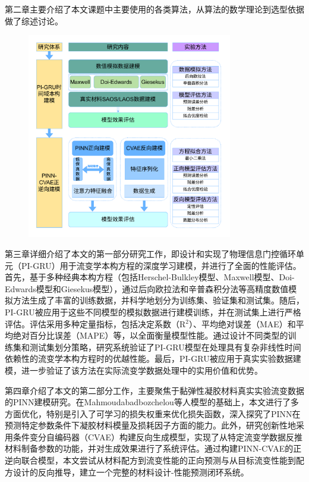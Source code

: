 第二章主要介绍了本文课题中主要使用的各类算法，从算法的数学理论到选型依据做了综述讨论。
\begin{figure}[htbp]
  \centering
  \includegraphics[width=0.8\textwidth]{Fig/HolisticResearchFramework.pdf}
\end{figure}


第三章详细介绍了本文的第一部分研究工作，即设计和实现了物理信息门控循环单元（PI-GRU）用于流变学本构方程的深度学习建模，并进行了全面的性能评估。首先，基于多种经典本构方程（包括Herschel-Bulkley模型、Maxwell模型、Doi-Edwards模型和Giesekus模型），通过后向欧拉法和辛普森积分法等高精度数值模拟方法生成了丰富的训练数据，并科学地划分为训练集、验证集和测试集。随后，PI-GRU被应用于这些不同模型的模拟数据进行建模训练，并在测试集上进行严格评估。评估采用多种定量指标，包括决定系数（R$^2$）、平均绝对误差（MAE）和平均绝对百分比误差（MAPE）等，以全面衡量模型性能。通过设计不同类型的训练集和测试集划分策略，研究系统验证了PI-GRU模型在处理具有复杂非线性时间依赖性的流变学本构方程时的优越性能。最后，PI-GRU被应用于真实实验数据建模，进一步验证了该方法在实际流变学数据处理中的实用价值和优势。

第四章介绍了本文的第二部分工作，主要聚焦于黏弹性凝胶材料真实实验流变数据的PINN建模研究。在Mahmoudabadbozchelou等人模型的基础上\cite{mahmoudabadbozchelouDatadrivenPhysicsinformedConstitutive2021}，本文进行了多方面优化，特别是引入了可学习的损失权重来优化损失函数，深入探究了PINN在预测特定参数条件下凝胶材料模量及损耗因子方面的能力。此外，研究创新性地采用条件变分自编码器（CVAE）构建反向生成模型，实现了从特定流变学数据反推材料制备参数的功能，并对生成效果进行了系统评估。通过构建PINN-CVAE的正逆向联合模型，本文尝试从材料配方到流变性能的正向预测与从目标流变性能到配方设计的反向推导，建立一个完整的材料设计-性能预测闭环系统。


